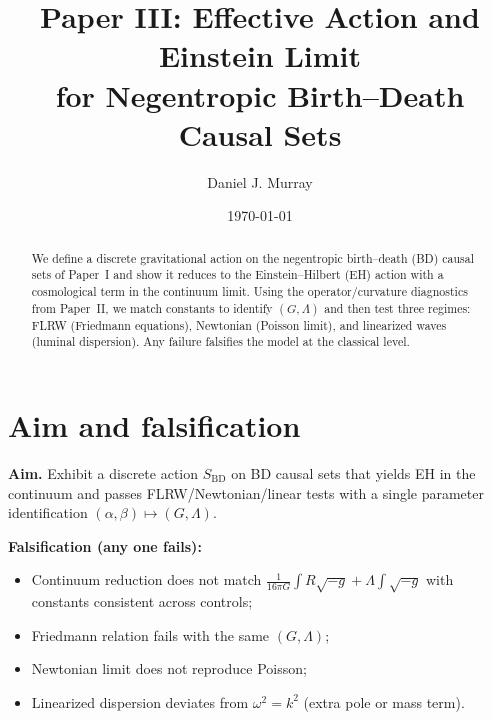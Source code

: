 \newcommand{\E}{\mathbb{E}}
\newcommand{\Var}{\mathrm{Var}}
\newcommand{\Boxop}{\Box}
\newcommand{\MM}{d_{\mathrm{MM}}}

\graphicspath{{figs3/}{paper3/figs/}}

\newcommand{\SafeGraphic}[2]{%
  \IfFileExists{#1}{\texttt{[image: \#1]}}{%
    \fbox{\parbox[c][2.2in][c]{#2\linewidth}{\centering\small \textsf{Missing figure:}\\\texttt{#1}}}%
  }%
}

\title{Paper III: Effective Action and Einstein Limit\\
for Negentropic Birth--Death Causal Sets}
\author{Daniel J. Murray}
\date{\today}


\maketitle

\begin{abstract}
We define a discrete gravitational action on the negentropic birth--death (BD) causal sets of Paper~I and show it reduces to the Einstein--Hilbert (EH) action with a cosmological term in the continuum limit. Using the operator/curvature diagnostics from Paper~II, we match constants to identify $(G,\Lambda)$ and then test three regimes: FLRW (Friedmann equations), Newtonian (Poisson limit), and linearized waves (luminal dispersion). Any failure falsifies the model at the classical level.
\end{abstract}

\section{Aim and falsification}
\textbf{Aim.} Exhibit a discrete action $S_{\mathrm{BD}}$ on BD causal sets that yields EH in the continuum and passes FLRW/Newtonian/linear tests with a single parameter identification $(\alpha,\beta)\mapsto(G,\Lambda)$.

\medskip\noindent\textbf{Falsification (any one fails):}
\begin{itemize}
\item Continuum reduction does not match $\frac{1}{16\pi G}\!\int R\sqrt{-g}+\Lambda\!\int\!\sqrt{-g}$ with constants consistent across controls;
\item Friedmann relation fails with the same $(G,\Lambda)$;
\item Newtonian limit does not reproduce Poisson;
\item Linearized dispersion deviates from $\omega^2=k^2$ (extra pole or mass term).
\end{itemize}

